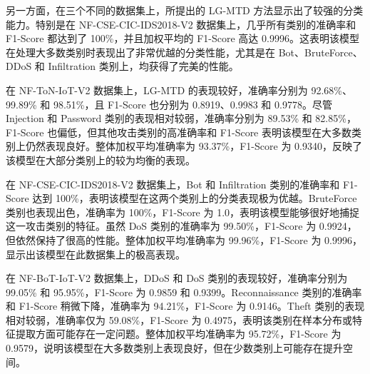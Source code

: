 \documentclass[promaster]{thesis-uestc}
\begin{document}
另一方面，在三个不同的数据集上，所提出的 LG-MTD 方法显示出了较强的分类能力。特别是在 NF-CSE-CIC-IDS2018-V2 数据集上，几乎所有类别的准确率和 F1-Score 都达到了 100\%，并且加权平均的 F1-Score 高达 0.9996。这表明该模型在处理大多数类别时表现出了非常优越的分类性能，尤其是在 Bot、BruteForce、DDoS 和 Infiltration 类别上，均获得了完美的性能。

在 NF-ToN-IoT-V2 数据集上，LG-MTD 的表现较好，准确率分别为 92.68\%、99.89\% 和 98.51\%，且 F1-Score 也分别为 0.8919、0.9983 和 0.9778。尽管 Injection 和 Password 类别的表现相对较弱，准确率分别为 89.53\% 和 82.85\%，F1-Score 也偏低，但其他攻击类别的高准确率和 F1-Score 表明该模型在大多数类别上仍然表现良好。整体加权平均准确率为 93.37\%，F1-Score 为 0.9340，反映了该模型在大部分类别上的较为均衡的表现。

在 NF-CSE-CIC-IDS2018-V2 数据集上，Bot 和 Infiltration 类别的准确率和 F1-Score 达到 100\%，表明该模型在这两个类别上的分类表现极为优越。BruteForce 类别也表现出色，准确率为 100\%，F1-Score 为 1.0，表明该模型能够很好地捕捉这一攻击类别的特征。虽然 DoS 类别的准确率为 99.50\%，F1-Score 为 0.9924，但依然保持了很高的性能。整体加权平均准确率为 99.96\%，F1-Score 为 0.9996，显示出该模型在此数据集上的极高表现。

在 NF-BoT-IoT-V2 数据集上，DDoS 和 DoS 类别的表现较好，准确率分别为 99.05\% 和 95.95\%，F1-Score 为 0.9859 和 0.9399。Reconnaissance 类别的准确率和 F1-Score 稍微下降，准确率为 94.21\%，F1-Score 为 0.9146。Theft 类别的表现相对较弱，准确率仅为 59.08\%，F1-Score 为 0.4975，表明该类别在样本分布或特征提取方面可能存在一定问题。整体加权平均准确率为 95.72\%，F1-Score 为 0.9579，说明该模型在大多数类别上表现良好，但在少数类别上可能存在提升空间。
\end{document}
